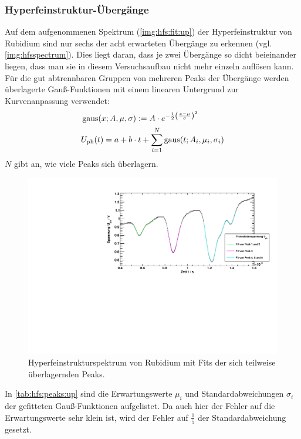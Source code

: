 \subsubsection*{Hyperfeinstruktur-Übergänge}
Auf dem aufgenommenen Spektrum (\autoref{img:hfs:fit:up}) der Hyperfeinstruktur von Rubidium sind nur sechs der acht erwarteten
Übergänge zu erkennen (vgl. \autoref{img:hfsspectrum}). Dies liegt daran, dass je zwei Übergänge so dicht beieinander liegen,  %
dass man sie in diesem Versuchsaufbau nicht mehr
einzeln auflösen kann. Für die gut abtrennbaren Gruppen von
mehreren Peaks der Übergänge werden überlagerte Gauß-Funktionen mit einem linearen Untergrund zur Kurvenanpassung verwendet:
\begin{equation}
    \begin{split}
        & \operatorname{gaus}(x; A, \mu, \sigma) := A \cdot e^{-\frac{1}{2} \left( \frac{x-\mu}{\sigma} \right)^2} \\
        & U_\text{ph}(t) = a + b \cdot t + \sum_{i=1}^N \operatorname{gaus}(t; A_i, \mu_i, \sigma_i)
    \end{split}
\end{equation}
$N$ gibt an, wie viele Peaks sich überlagern.
\begin{figure}[H]
\begin{center}
    \includegraphics[width=\textwidth]{../img/part2/up-hfs_zoom_fit.pdf}
    \caption{Hyperfeinstrukturspektrum von Rubidium mit Fits der sich teilweise überlagernden Peaks.}
    \label{img:hfs:fit:up}
\end{center}
\end{figure}
In \autoref{tab:hfs:peaks:up} sind die Erwartungswerte $\mu_i$ und Standardabweichungen $\sigma_i$ der gefitteten Gauß-Funktionen aufgelistet. 
Da auch hier der Fehler auf die Erwartungswerte sehr klein ist, wird der Fehler auf $\frac{1}{5}$ der Standardabweichung gesetzt.


